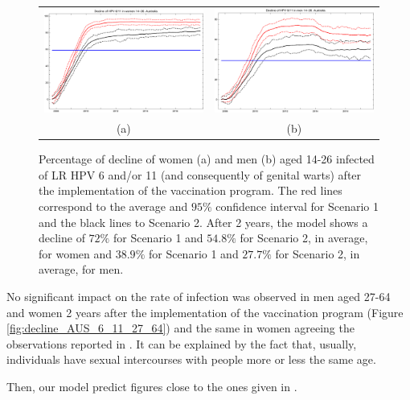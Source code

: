 \begin{figure}[!]
	\centering
	\begin{tabular}{cc}
		\includegraphics[width=0.5\linewidth]{IMGs/3.-Australia/Decl_muj_14_26_verr_Australia.pdf}	& 
		\includegraphics[width=0.5\linewidth]{IMGs/3.-Australia/Decl_hom_14_26_verr_Australia.pdf}  \\ 
		(a)	& (b) 
	\end{tabular} 
	\caption{Percentage of decline of women (a) and men (b) aged 14-26 infected of LR HPV 6 and/or 11 (and consequently of genital warts) after the implementation of the vaccination program. The red lines correspond to the average and $95\%$ confidence interval for Scenario 1 and the black lines to Scenario 2. After 2 years, the model shows a decline of $72\%$ for Scenario 1 and $54.8\%$ for Scenario 2, in average, for women and $38.9\%$ for Scenario 1 and $27.7\%$ for Scenario 2, in average, for men.}
	\label{fig:decline_AUS_6_11}
\end{figure}

No significant impact on the rate of infection was observed in men aged 27-64 and women 2 years after the implementation of the vaccination program (Figure \ref{fig:decline_AUS_6_11_27_64}) and the same in women agreeing the observations reported in \cite{ali2013genital}. It can be explained by the fact that, usually, individuals have sexual intercourses with people more or less the same age.

Then, our model predict figures close to the ones given in \cite{ali2013genital}.

